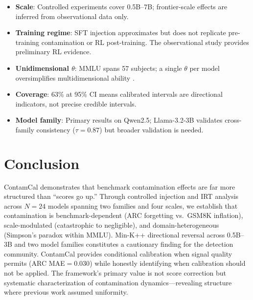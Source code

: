 \documentclass[11pt,a4paper]{article}
\newcommand{\thet}{\theta}
\begin{document}
\begin{itemize}[leftmargin=*,nosep]
\item \textbf{Scale}: Controlled experiments cover 0.5B--7B; frontier-scale effects are inferred from observational data only.
\item \textbf{Training regime}: SFT injection approximates but does not replicate pre-training contamination or RL post-training. The observational study provides preliminary RL evidence.
\item \textbf{Unidimensional $\thet$}: MMLU spans 57 subjects; a single $\thet$ per model oversimplifies multidimensional ability \cite{reckase2009multidimensional,burnell2023rethinking}.
\item \textbf{Coverage}: 63\% at 95\% CI means calibrated intervals are directional indicators, not precise credible intervals.
\item \textbf{Model family}: Primary results on Qwen2.5; Llama-3.2-3B validates cross-family consistency ($\tau{=}0.87$) but broader validation is needed.
\end{itemize}

\section{Conclusion}

ContamCal demonstrates that benchmark contamination effects are far more structured than ``scores go up.'' Through controlled injection and IRT analysis across $N{=}24$ models spanning two families and four scales, we establish that contamination is benchmark-dependent (ARC forgetting vs.\ GSM8K inflation), scale-modulated (catastrophic to negligible), and domain-heterogeneous (Simpson's paradox within MMLU). Min-K++ directional reversal across 0.5B--3B and two model families constitutes a cautionary finding for the detection community. ContamCal provides conditional calibration when signal quality permits (ARC MAE${=}0.030$) while honestly identifying when calibration should not be applied. The framework's primary value is not score correction but systematic characterization of contamination dynamics---revealing structure where previous work assumed uniformity.

\end{document}
